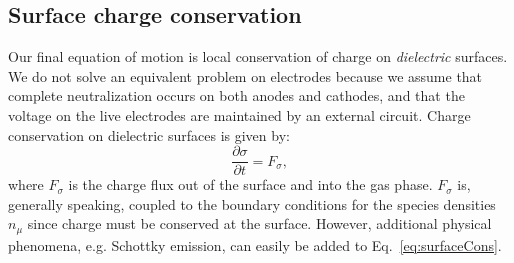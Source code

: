 \documentclass[3p]{elsarticle}
\begin{document}
\subsection{Surface charge conservation}
Our final equation of motion is local conservation of charge on \emph{dielectric} surfaces. We do not solve an equivalent problem on electrodes because we assume that complete neutralization occurs on both anodes and cathodes, and that the voltage on the live electrodes are maintained by an external circuit. Charge conservation on dielectric surfaces is given by:
\begin{equation}
  \label{eq:surfaceCons} 
  \frac{\partial \sigma}{\partial t} = F_\sigma,
\end{equation}
where $F_\sigma$ is the charge flux out of the surface and into the gas phase. $F_\sigma$ is, generally speaking, coupled to the boundary conditions for the species densities $n_\mu$ since charge must be conserved at the surface. However, additional physical phenomena, e.g. Schottky emission, can easily be added to Eq.~\eqref{eq:surfaceCons}. 




\end{document}
